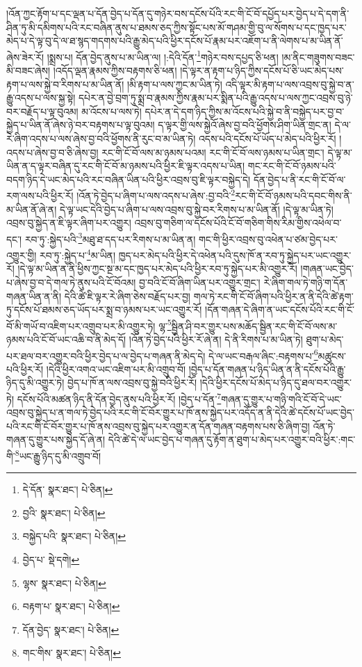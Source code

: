 །འོན་ཀྱང་རྟོག་པ་དང་ལྡན་པ་དོན་བྱེད་པ་དོན་དུ་གཉེར་བས་དངོས་པོའི་རང་གི་ངོ་བོ་དཔྱོད་པར་བྱེད་པ་དེ་དག་ནི་ཤིན་ཏུ་མི་དམིགས་པའི་རང་བཞིན་ནུས་པ་ཐམས་ཅད་ཀྱིས་སྟོང་པས་མོ་གཤམ་གྱི་བུ་ལ་སོགས་པ་དང་ཁྱད་པར་མེད་པ་དེ་ལྟ་བུ་དེ་ལ་ཐ་སྙད་གདགས་པའི་རྒྱུ་མེད་པའི་ཕྱིར་དངོས་པོ་རྣམ་པར་འཇོག་པ་ནི་ལེགས་པ་མ་ཡིན་ནོ་ཞེས་ཟེར་རོ། །སྨྲས་པ། དོན་བྱེད་ནུས་པ་མ་ཡིན་ལ། །:དེའི་དོན་\footnote{དེ་དོན་  སྣར་ཐང་།  པེ་ཅིན། }གཉེར་བས་དཔྱད་ཅི་ཕན། །མ་ནིང་གཟུགས་བཟང་མི་བཟང་ཞེས། །འདོད་ལྡན་རྣམས་ཀྱིས་བརྟགས་ཅི་ཕན། །དེ་ལྟར་ན་རྟག་པ་ཉིད་ཀྱིས་དངོས་པོ་ཅི་ཡང་མེད་པས་རྟག་པ་ལས་སྐྱེ་བ་རིགས་པ་མ་ཡིན་ནོ། །མི་རྟག་པ་ལས་ཀྱང་མ་ཡིན་ཏེ། འདི་ལྟར་མི་རྟག་པ་ལས་འབྲས་བུ་སྐྱེ་བ་ན་རྒྱུ་འདས་པ་ལས་སྐྱ་སྟེ། དཔེར་ན་བྱེ་བྲག་ཏུ་སྨྲ་བ་རྣམས་ཀྱིས་རྣམ་པར་སྨིན་པའི་རྒྱུ་འདས་པ་ལས་ཀྱང་འབྲས་བུ་ཉེ་བར་བརྗོད་པ་ལྟ་བུའམ། མ་འོངས་པ་ལས་ཏེ། དཔེར་ན་དེ་དག་ཉིད་ཀྱིས་མ་འོངས་པའི་སྐྱེ་བ་ནི་བསྐྱེད་པར་བྱ་བ་སྐྱེད་པ་ཡིན་ནོ་ཞེས་ཉེ་བར་བརྟགས་པ་ལྟ་བུའམ། ད་ལྟར་གྱི་ལས་སྐྱེའོ་ཞེས་བྱ་བའི་ཕྱོགས་ཤིག་ཡིན་གྲང་ན། དེ་ལ་རེ་ཞིག་འདས་པ་ལས་ཞེས་བྱ་བའི་ཕྱོགས་ནི་རུང་བ་མ་ཡིན་ཏེ། འདས་པའི་དངོས་པོ་ཡོད་པ་མེད་པའི་ཕྱིར་རོ། །འདས་པ་ཞེས་བྱ་བ་ཅི་ཞེས་བྱ། རང་གི་ངོ་བོ་ལས་མ་ཉམས་པའམ། རང་གི་ངོ་བོ་ལས་ཉམས་པ་ཡིན་གྲང་། དེ་ལྟ་མ་ཡིན་ན་ད་ལྟར་བཞིན་དུ་རང་གི་ངོ་བོ་མ་ཉམས་པའི་ཕྱིར་ཇི་ལྟར་འདས་པ་ཡིན། གང་རང་གི་ངོ་བོ་ཉམས་པའི་བདག་ཉིད་དེ་ཡང་མེད་པའི་རང་བཞིན་ཡིན་པའི་ཕྱིར་འབྲས་བུ་ཇི་ལྟར་བསྐྱེད་དེ། དོན་བྱེད་པ་ནི་རང་གི་ངོ་བོ་ལ་རག་ལས་པའི་ཕྱིར་རོ། །འོན་ཏེ་བྱེད་པ་ཞིག་པ་ལས་འདས་པ་ཞེས་:བྱ་བའི་\footnote{བྱའི་  སྣར་ཐང་།  པེ་ཅིན། }རང་གི་ངོ་བོ་ཉམས་པའི་དབང་གིས་ནི་མ་ཡིན་ནོ་ཞེ་ན། དེ་ལྟ་ཡང་དེའི་བྱེད་པ་ཞིག་པ་ལས་འབྲས་བུ་སྐྱེ་བར་རིགས་པ་མ་ཡིན་ནོ། །དེ་ལྟ་མ་ཡིན་ཏེ། འབྲས་བུ་སྐྱེད་ན་ཇི་ལྟར་ཞིག་པར་འགྱུར། འབྲས་བུ་གཅིག་ལ་དངོས་པོའི་ངོ་བོ་གཅིག་གིས་རིམ་གྱིས་འཕེལ་བ་དང་། རབ་ཏུ་:སྐྱེད་པའི་\footnote{བསྐྱེད་པའི་  སྣར་ཐང་།  པེ་ཅིན། }མཐུ་ཐ་དད་པར་རིགས་པ་མ་ཡིན་ན། གང་གི་ཕྱིར་འབྲས་བུ་འཕེན་པ་ཙམ་བྱེད་པར་འགྱུར་གྱི། རབ་ཏུ་:སྐྱེད་པ་\footnote{བྱེད་པ་  སྡེ་དགེ། }མ་ཡིན། ཁྱད་པར་མེད་པའི་ཕྱིར་དེ་འཕེན་པའི་དུས་ཁོ་ན་རབ་ཏུ་སྐྱེད་པར་ཡང་འགྱུར་རོ། །དེ་ལྟ་མ་ཡིན་ན་ནི་ཕྱིས་ཀྱང་སྔ་མ་དང་ཁྱད་པར་མེད་པའི་ཕྱིར་རབ་ཏུ་སྐྱེད་པར་མི་འགྱུར་རོ། །གཞན་ཡང་བྱེད་པ་ཞེས་བྱ་བ་དེ་གལ་ཏེ་ནུས་པའི་ངོ་བོའམ། བྱ་བའི་ངོ་བོ་ཞིག་ཡིན་པར་འགྱུར་གྲང་། རེ་ཞིག་གལ་ཏེ་གཉི་ག་དོན་གཞན་ཡིན་ན་ནི། དེའི་ཚེ་ཇི་ལྟར་རེ་ཞིག་ཅེས་བརྗོད་པར་བྱ། གལ་ཏེ་རང་གི་ངོ་བོ་ཞིག་པའི་ཕྱིར་ན་ནི་དེའི་ཚེ་རྟག་ཏུ་དངོས་པོ་ཐམས་ཅད་ཡོད་པར་སྨྲ་བ་ཉམས་པར་ཡང་འགྱུར་རོ། །དོན་གཞན་དེ་ཞིག་ན་ཡང་དངོས་པོའི་རང་གི་ངོ་བོ་མི་གཡོ་བ་འཇིག་པར་འགྲུབ་པར་མི་འགྱུར་ཏེ། ལྷ་\footnote{ལྷས་  སྣར་ཐང་།  པེ་ཅིན། }སྦྱིན་ཤི་བར་གྱུར་པས་མཆོད་སྦྱིན་རང་གི་ངོ་བོ་ལས་མ་ཉམས་པའི་ངོ་བོ་ཡང་འཆི་བ་ནི་མེད་དོ། །འོན་ཏེ་བྱེད་པའི་ཕྱིར་རོ་ཞེ་ན། དེ་ནི་རིགས་པ་མ་ཡིན་ཏེ། ཐུག་པ་མེད་པར་ཐལ་བར་འགྱུར་བའི་ཕྱིར་བྱེད་པ་ལ་བྱེད་པ་གཞན་ནི་མེད་དེ། དེ་ལ་ཡང་བརྒལ་ཞིང་:བརྟགས་པ་\footnote{བརྟག་པ་  སྣར་ཐང་།  པེ་ཅིན། }མཚུངས་པའི་ཕྱིར་རོ། །དེའི་ཕྱིར་འགའ་ཡང་འཇིག་པར་མི་འགྲུབ་བོ། །བྱེད་པ་དོན་གཞན་པ་ཉིད་ཡིན་ན་ནི་དངོས་པོའི་རྒྱུ་ཉིད་དུ་མི་འགྱུར་ཏེ། བྱེད་པ་ཁོ་ན་ལས་འབྲས་བུ་སྐྱེ་བའི་ཕྱིར་རོ། །དེའི་ཕྱིར་དངོས་པོ་མེད་པ་ཉིད་དུ་ཐལ་བར་འགྱུར་ཏེ། དངོས་པོའི་མཚན་ཉིད་ནི་དོན་བྱེད་ནུས་པའི་ཕྱིར་རོ། །བྱེད་པ་དོན་\footnote{དོན་བྱེད་  སྣར་ཐང་།  པེ་ཅིན། }གཞན་དུ་གྱུར་པ་གཉི་གའི་ངོ་བོ་དེ་ཡང་འབྲས་བུ་སྐྱེད་པ་ན་གལ་ཏེ་བྱེད་པའི་རང་གི་ངོ་བོར་གྱུར་པ་ཁོ་ནས་སྐྱེད་པར་འདོད་ན་ནི་དེའི་ཚེ་དངོས་པོ་ཡང་བྱེད་པའི་རང་གི་ངོ་བོར་གྱུར་པ་ཁོ་ནས་འབྲས་བུ་སྐྱེད་པར་འགྱུར་ན་དོན་གཞན་བརྟགས་པས་ཅི་ཞིག་བྱ། འོན་ཏེ་གཞན་དུ་གྱུར་པས་སྐྱེད་དོ་ཞེ་ན། དེའི་ཚེ་དེ་ལ་ཡང་བྱེད་པ་གཞན་དུ་རྟོག་ན་ཐུག་པ་མེད་པར་འགྱུར་བའི་ཕྱིར་:གང་གི་\footnote{གང་གིས་  སྣར་ཐང་།  པེ་ཅིན། }ཡང་རྒྱུ་ཉིད་དུ་མི་འགྲུབ་བོ། 